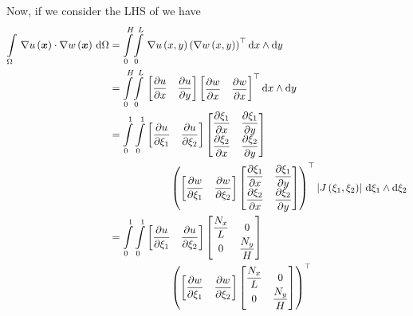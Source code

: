 Now, if we consider the LHS of  we have
\begin{equation}
  \begin{aligned}
    \gint{\Omega}{}{\dotprod{\gradient{}{\fnof{u}{\vectr{x}}}}{\gradient{}{\fnof{w}{\vectr{x}}}}}{\Omega}&=
    \giint{0}{H}{0}{L}{\gradient{}{\fnof{u}{x,y}}\transpose{\pbrac{\gradient{}{\fnof{w}{x,y}}}}}{x}{y}\\
    &=\giint{0}{H}{0}{L}{\begin{bmatrix}\delby{u}{x}&\delby{u}{y}\end{bmatrix}
      \transpose{\begin{bmatrix}\delby{w}{x}&\delby{w}{x}\end{bmatrix}}}{x}{y} \\
    &=\dintl{0}{1}\dintl{0}{1}\begin{bmatrix}\delby{u}{\xi_{1}}&\delby{u}{\xi_{2}}\end{bmatrix}\begin{bmatrix}
      \delby{\xi_{1}}{x} & \delby{\xi_{1}}{y} \\
      \delby{\xi_{2}}{x} & \delby{\xi_{2}}{y}
    \end{bmatrix} \\
    &\qquad\qquad\qquad\transpose{\pbrac{\begin{bmatrix}\delby{w}{\xi_{1}}&\delby{w}{\xi_{2}}\end{bmatrix}\begin{bmatrix}
      \delby{\xi_{1}}{x} & \delby{\xi_{1}}{y} \\
      \delby{\xi_{2}}{x} & \delby{\xi_{2}}{y}
    \end{bmatrix}}}\abs{\fnof{J}{\xi_{1},\xi_{2}}}\,\exteriorderivop\xi_{1}\wedge\exteriorderivop\xi_{2} \\ 
    &=\dintl{0}{1}\dintl{0}{1}\begin{bmatrix}\delby{u}{\xi_{1}}&\delby{u}{\xi_{2}}\end{bmatrix}\begin{bmatrix}
      \dfrac{N_{x}}{L} & 0 \\
      0 & \dfrac{N_{y}}{H}
    \end{bmatrix} \\
    &\qquad\qquad\qquad\transpose{\pbrac{\begin{bmatrix}\delby{w}{\xi_{1}}&\delby{w}{\xi_{2}}\end{bmatrix}\begin{bmatrix}
      \dfrac{N_{x}}{L} & 0 \\
      0 & \dfrac{N_{y}}{H}

\end{bmatrix}}}
\end{aligned}
\end{equation}
